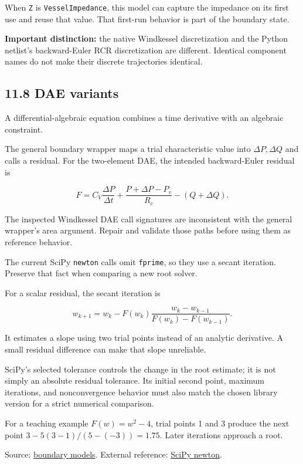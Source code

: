 \documentclass[11pt,a4paper]{article}
\begin{document}
When \texttt{Z} is \texttt{VesselImpedance}, this model can capture the impedance on its first use and reuse that value. That first-run behavior is part of the boundary state.

\textbf{Important distinction:} the native Windkessel discretization and the Python netlist's backward-Euler RCR discretization are different. Identical component names do not make their discrete trajectories identical.

\subsection{11.8 DAE variants}
A differential-algebraic equation combines a time derivative with an algebraic constraint.

The general boundary wrapper maps a trial characteristic value into \(\Delta P,\Delta Q\) and calls a residual. For the two-element DAE, the intended backward-Euler residual is


\begingroup\small
\[
F=C_V\frac{\Delta P}{\Delta t}
+\frac{P+\Delta P-P_v}{R_c}
-(Q+\Delta Q).
\]
\endgroup


The inspected Windkessel DAE call signatures are inconsistent with the general wrapper's area argument. Repair and validate those paths before using them as reference behavior.

The current SciPy \texttt{newton} calls omit \texttt{fprime}, so they use a secant iteration. Preserve that fact when comparing a new root solver.

For a scalar residual, the secant iteration is


\begingroup\small
\[
w_{k+1}
=w_k-F(w_k)
\frac{w_k-w_{k-1}}{F(w_k)-F(w_{k-1})}.
\]
\endgroup


It estimates a slope using two trial points instead of an analytic derivative. A small residual difference can make that slope unreliable.

SciPy's selected tolerance controls the change in the root estimate; it is not simply an absolute residual tolerance. Its initial second point, maximum iterations, and nonconvergence behavior must also match the chosen library version for a strict numerical comparison.

For a teaching example \(F(w)=w^2-4\), trial points 1 and 3 produce the next point \(3-5(3-1)/(5-(-3))=1.75\). Later iterations approach a root.

Source: \href{/home/sadid/starfish/NetworkLib/classBoundaryConditions.py}{boundary models}. External reference: \href{https://docs.scipy.org/doc/scipy/reference/generated/scipy.optimize.newton.html}{SciPy newton}.
\end{document}
